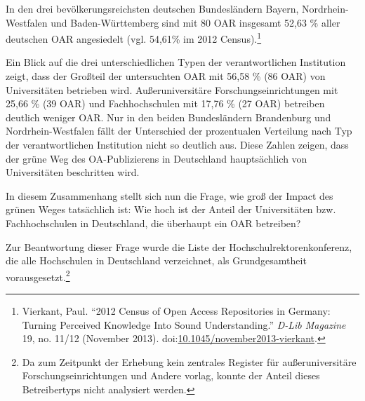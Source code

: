 \documentclass[a4paper,
fontsize=11pt,
oneside,
numbers=noperiodatend,
parskip=half-,
bibliography=totoc,
final
]{scrartcl}
\begin{document}
In den drei bevölkerungsreichsten deutschen Bundesländern Bayern,
Nordrhein-Westfalen und Baden-Württemberg sind mit 80 OAR insgesamt
52,63 \% aller deutschen OAR angesiedelt (vgl. 54,61\% im 2012
Census).\footnote{Vierkant, Paul. \enquote{2012 Census of Open Access
  Repositories in Germany: Turning Perceived Knowledge Into Sound
  Understanding.} \emph{D-Lib Magazine} 19, no. 11/12 (November 2013).
  doi:\href{http://doi.org/10.1045/november2013-vierkant}{10.1045/november2013-vierkant}.}

Ein Blick auf die drei unterschiedlichen Typen der verantwortlichen
Institution zeigt, dass der Großteil der untersuchten OAR mit 56,58 \%
(86 OAR) von Universitäten betrieben wird. Außeruniversitäre
Forschungseinrichtungen mit 25,66 \% (39 OAR) und Fachhochschulen mit
17,76 \% (27 OAR) betreiben deutlich weniger OAR. Nur in den beiden
Bundesländern Brandenburg und Nordrhein-Westfalen fällt der Unterschied
der prozentualen Verteilung nach Typ der verantwortlichen Institution
nicht so deutlich aus. Diese Zahlen zeigen, dass der grüne Weg des
OA-Publizierens in Deutschland hauptsächlich von Universitäten
beschritten wird.

In diesem Zusammenhang stellt sich nun die Frage, wie groß der Impact
des grünen Weges tatsächlich ist: Wie hoch ist der Anteil der
Universitäten bzw. Fachhochschulen in Deutschland, die überhaupt ein OAR
betreiben?

Zur Beantwortung dieser Frage wurde die Liste der
Hochschulrektorenkonferenz, die alle Hochschulen in Deutschland
verzeichnet, als Grundgesamtheit vorausgesetzt.\footnote{Da zum
  Zeitpunkt der Erhebung kein zentrales Register für außeruniversitäre
  Forschungseinrichtungen und Andere vorlag, konnte der Anteil dieses
  Betreibertyps nicht analysiert werden.}
\end{document}
